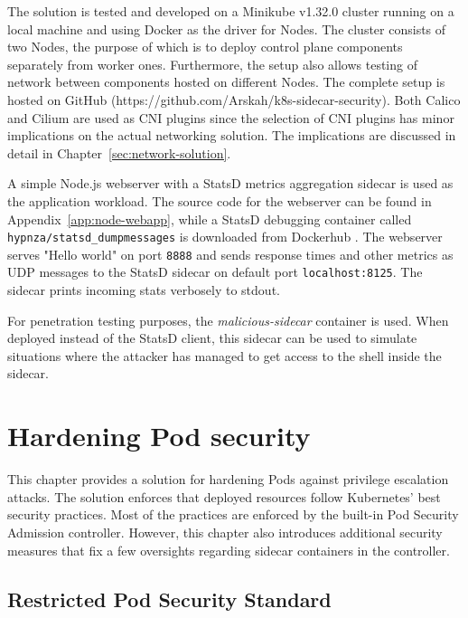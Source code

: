 \documentclass[english, 12pt, a4paper, sci, utf8, a-2b, online]{aaltothesis}
\begin{document}
The solution is tested and developed on a Minikube v1.32.0 cluster running on a local machine and using Docker as the driver for Nodes.
The cluster consists of two Nodes, the purpose of which is to deploy control plane components separately from worker ones.
Furthermore, the setup also allows testing of network between components hosted on different Nodes.
The complete setup is hosted on GitHub (https://github.com/Arskah/k8s-sidecar-security).
Both Calico and Cilium are used as CNI plugins since the selection of CNI plugins has minor implications on the actual networking solution. %
The implications are discussed in detail in Chapter~\ref{sec:network-solution}.

A simple Node.js webserver with a StatsD metrics aggregation sidecar is used as the application workload.
The source code for the webserver can be found in Appendix~\ref{app:node-webapp}, while a StatsD debugging container called \lstinline{hypnza/statsd_dumpmessages} is downloaded from Dockerhub \cite{statsd-container}.
The webserver serves "Hello world" on port \lstinline{8888} and sends response times and other metrics as UDP messages to the StatsD sidecar on default port \lstinline{localhost:8125}.
The sidecar prints incoming stats verbosely to stdout.

For penetration testing purposes, the \emph{malicious-sidecar} container is used.
When deployed instead of the StatsD client, this sidecar can be used to simulate situations where the attacker has managed to get access to the shell inside the sidecar.

\clearpage

\section{Hardening Pod security} \label{sec:pod-hardening}

This chapter provides a solution for hardening Pods against privilege escalation attacks.
The solution enforces that deployed resources follow Kubernetes' best security practices.
Most of the practices are enforced by the built-in Pod Security Admission controller.
However, this chapter also introduces additional security measures that fix a few oversights regarding sidecar containers in the controller.

\subsection{Restricted Pod Security Standard}
\end{document}

